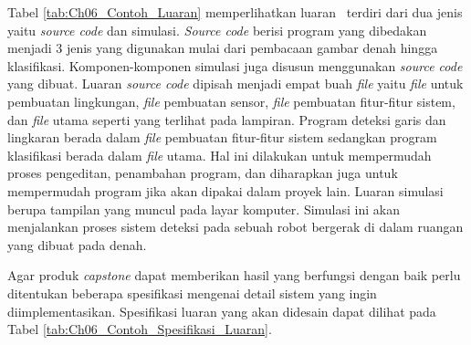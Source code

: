     Tabel \ref*{tab:Ch06_Contoh_Luaran} memperlihatkan luaran \capstone\ terdiri dari dua jenis yaitu \textit{source code} dan simulasi. \textit{Source code} berisi program yang dibedakan menjadi 3 jenis yang digunakan mulai dari pembacaan gambar denah hingga klasifikasi. Komponen-komponen simulasi juga disusun menggunakan \textit{source code} yang dibuat. Luaran \textit{source code} dipisah menjadi empat buah \textit{file} yaitu \textit{file} untuk pembuatan lingkungan, \textit{file} pembuatan sensor, \textit{file} pembuatan fitur-fitur sistem, dan \textit{file} utama seperti yang terlihat pada lampiran. Program deteksi garis dan lingkaran berada dalam \textit{file} pembuatan fitur-fitur sistem sedangkan program klasifikasi berada dalam \textit{file} utama. Hal ini dilakukan untuk mempermudah proses pengeditan, penambahan program, dan diharapkan juga untuk mempermudah program jika akan dipakai dalam proyek lain. Luaran simulasi berupa tampilan yang muncul pada layar komputer. Simulasi ini akan menjalankan proses sistem deteksi pada sebuah robot bergerak di dalam ruangan yang dibuat pada denah.

    Agar produk \textit{capstone} dapat memberikan hasil yang berfungsi dengan baik perlu ditentukan beberapa spesifikasi mengenai detail sistem yang ingin diimplementasikan. Spesifikasi luaran yang akan didesain dapat dilihat pada Tabel \ref{tab:Ch06_Contoh_Spesifikasi_Luaran}.
    

